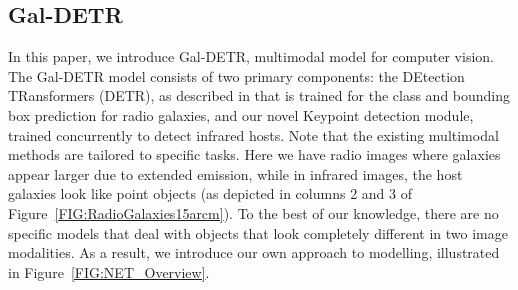 \documentclass[
  journal=pasa,
  manuscript=research-paper, %
  year=2020,
  volume=37,
]{cup-journal}
\begin{document}
\subsection{Gal-DETR}
\label{SEC:GalDETR}
In this paper, we introduce Gal-DETR, multimodal model for computer vision. The Gal-DETR model consists of two primary components: the DEtection TRansformers (DETR), as described in \citet[][]{carion2020end} that is trained for the class and bounding box prediction for radio galaxies, and our novel Keypoint detection module, trained concurrently to detect infrared hosts.
Note that the existing multimodal methods are tailored to specific tasks. Here we have radio images where galaxies appear larger due to extended emission, while in infrared images, the host galaxies look like point objects (as depicted in columns 2 and 3 of Figure~\ref{FIG:RadioGalaxies15arcm}). To the best of our knowledge, there are no specific models that deal with objects that look completely different in two image modalities. As a result, we introduce our own approach to modelling, illustrated in Figure~\ref{FIG:NET_Overview}.
\end{document}
